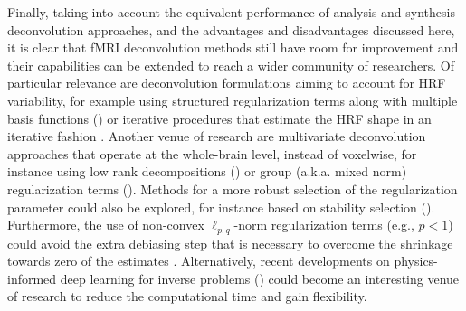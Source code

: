 Finally, taking into account the equivalent performance of analysis and synthesis deconvolution approaches, and the advantages and disadvantages discussed here, it is clear that fMRI deconvolution methods still have room for improvement and their capabilities can be extended to reach a wider community of researchers. Of particular relevance are deconvolution formulations aiming to account for HRF variability, for example using structured regularization terms along with multiple basis functions (\citealt{Gaudes2012Structuredsparsedeconvolution}) or iterative procedures that estimate the HRF shape in an iterative fashion \citealt{Farouj2019BoldSignalDeconvolution,cherkaoui:hal-03005584}. Another venue of research are multivariate deconvolution approaches that operate at the whole-brain level, instead of voxelwise, for instance using low rank decompositions (\citealt{cherkaoui:hal-03005584}) or group (a.k.a. mixed norm) regularization terms (\citealt{urunuela-tremino_2019}). Methods for a more robust selection of the regularization parameter could also be explored, for instance based on stability selection (\citealt{Meinshausen2010Stabilityselection,Urunuela2020StabilityBasedSparse}). Furthermore, the use of non-convex \(\ell_{p,q}\)-norm regularization terms (e.g., \(p < 1\)) could avoid the extra debiasing step that is necessary to overcome the shrinkage towards zero of the estimates \citealt{Gaudes2013Paradigmfreemapping,CaballeroGaudes2019deconvolutionalgorithmmulti}. Alternatively, recent developments on physics-informed deep learning for inverse problems (\citealt{Akcakaya2021,Monga2021,Ongie2020}) could become an interesting venue of research to reduce the computational time and gain flexibility.